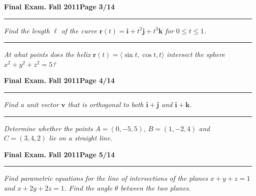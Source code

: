 \documentclass[12pt]{article}
\begin{document}
\hfill{\large\bf Final Exam.}\hfill{\large\bf
  Fall 2011}\hfill{\large\bf Page 3/14}\hrule

\bigskip
{\problem[15 pts] \em Find the length $\ell$ of the curve $\boldsymbol{r}(t) =
\boldsymbol{i} + t^2 \boldsymbol{j} + t^3 \boldsymbol{k}$ for $0 \leq t \leq
1$.} 
\vspace{9.5cm}
\begin{flushright}
\end{flushright}
\hrule
{\problem[10 pts] \em At what points does the helix $\boldsymbol{r}(t) = \langle \sin t, \cos t, t \rangle$ intersect the sphere $x^2+y^2+z^2=5$?}
\vspace{7.5cm}
\begin{flushright}
\end{flushright}
\newpage

\hfill{\large\bf Final Exam.}\hfill{\large\bf
  Fall 2011}\hfill{\large\bf Page 4/14}\hrule

\bigskip
{\problem[15 pts] \em Find a unit vector $\boldsymbol{v}$ that is orthogonal
to both $\boldsymbol{i} + \boldsymbol{j}$ and $\boldsymbol{i} +
\boldsymbol{k}$.} 
\vspace{11cm}
\begin{flushright}
\end{flushright}
\hrule
{\problem[10 pts] \em Determine whether the points $A=(0,-5,5)$, $ B=
(1,-2,4)$ and $C=(3,4,2)$ lie on a straight line.}
\newpage

\hfill{\large\bf Final Exam.}\hfill{\large\bf
  Fall 2011}\hfill{\large\bf Page 5/14}\hrule

\bigskip
{\problem[20 pts] \em Find parametric equations for the line of intersections
of the planes $x+y+z=1$ and $x+2y+2z=1$.  Find the angle $\theta$ between the
two planes.}
\vspace{18.5cm}
\begin{flushright}
\end{flushright}
\end{document}
